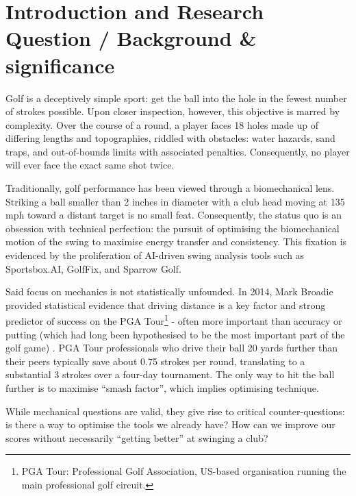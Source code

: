\documentclass[11pt, letterpaper]{article}
\begin{document}
\newpage
\setcounter{page}{1} %

\section{Introduction and Research Question / Background \& significance}

Golf is a deceptively simple sport: get the ball into the hole in the fewest number of strokes possible. Upon closer inspection, however, this objective is marred by complexity. Over the course of a round, a player faces 18 holes made up of differing lengths and topographies, riddled with obstacles: water hazards, sand traps, and out-of-bounds limits with associated penalties. Consequently, no player will ever face the exact same shot twice.

Traditionally, golf performance has been viewed through a biomechanical lens. Striking a ball smaller than 2 inches in diameter with a club head moving at 135 mph toward a distant target is no small feat. Consequently, the status quo is an obsession with technical perfection: the pursuit of optimising the biomechanical motion of the swing to maximise energy transfer and consistency. This fixation is evidenced by the proliferation of AI-driven swing analysis tools such as Sportsbox.AI, GolfFix, and Sparrow Golf.

Said focus on mechanics is not statistically unfounded. In 2014, Mark Broadie provided statistical evidence that driving distance is a key factor and strong predictor of success on the PGA Tour\footnote{PGA Tour: Professional Golf Association, US-based organisation running the main professional golf circuit.} - often more important than accuracy or putting (which had long been hypothesised to be the most important part of the golf game) \parencite{Broadie_2014a}. PGA Tour professionals who drive their ball 20 yards further than their peers typically save about 0.75 strokes per round, translating to a substantial 3 strokes over a four-day tournament. The only way to hit the ball further is to maximise “smash factor”, which implies optimising technique. 

While mechanical questions are valid, they give rise to critical counter-questions: is there a way to optimise the tools we already have? How can we improve our scores without necessarily “getting better” at swinging a club? 
\end{document}

